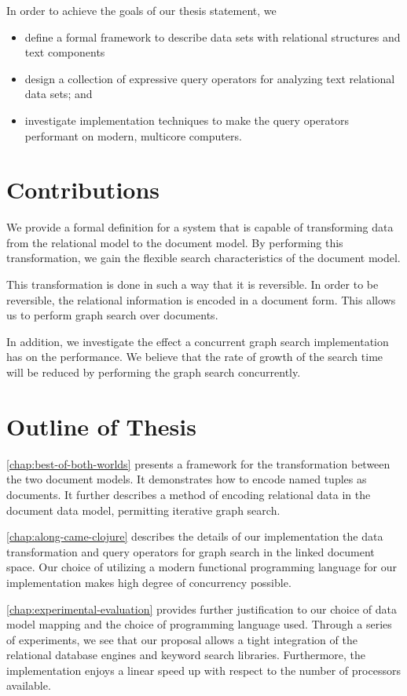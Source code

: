 		In order to achieve the goals of our thesis statement, we
		
		\begin{itemize}
			\item define a formal framework to describe data sets with relational structures and text components
			\item design a collection of expressive query operators for analyzing text relational data sets; and
			\item investigate implementation techniques to make the query operators performant on modern, multicore computers.
		\end{itemize}
		
	 \section{Contributions}
	 	We provide a formal definition for a system that is capable of transforming data from the relational model to the document model.  By performing this transformation, we gain the flexible search characteristics of the document model.
	 	
	 	This transformation is done in such a way that it is reversible.  In order to be reversible, the relational information is encoded in a document form.  This allows us to perform graph search over documents.
	 	
	 	In addition, we investigate the effect a concurrent graph search implementation has on the performance.  We believe that the rate of growth of the search time will be reduced by performing the graph search concurrently.
	
	\section{Outline of Thesis}
		\cref{chap:best-of-both-worlds} presents a framework for the transformation between the two document models.  It demonstrates how to encode named tuples as documents.  It further describes a method of encoding relational data in the document data model, permitting iterative graph search.
		
		\cref{chap:along-came-clojure} describes the details of our implementation the data transformation and query operators for graph search in the linked document space.  Our choice of utilizing a modern functional programming language for our implementation makes high degree of concurrency possible.
		
		\cref{chap:experimental-evaluation} provides further justification to our choice of data model mapping and the choice of programming language used.  Through a series of experiments, we see that our proposal allows a tight integration of the relational database engines and keyword search libraries.  Furthermore, the implementation enjoys a linear speed up with respect to the number of processors available.